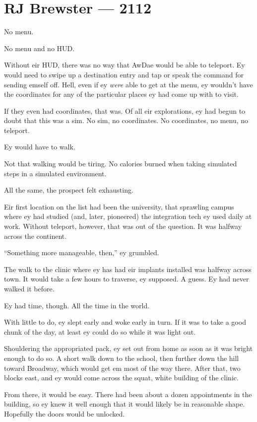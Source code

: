 \hypertarget{rj-brewster-2112}{%
\chapter*{RJ Brewster — 2112}\label{rj-brewster-2112}}

No menu.

No menu and no HUD.

Without eir HUD, there was no way that AwDae would be able to teleport. Ey would need to swipe up a destination entry and tap or speak the command for sending emself off. Hell, even if ey \emph{were} able to get at the menu, ey wouldn't have the coordinates for any of the particular places ey had come up with to visit.

If they even had coordinates, that was. Of all eir explorations, ey had begun to doubt that this was a sim. No sim, no coordinates. No coordinates, no menu, no teleport.

Ey would have to walk.

Not that walking would be tiring. No calories burned when taking simulated steps in a simulated environment.

All the same, the prospect felt exhausting.

Eir first location on the list had been the university, that sprawling campus where ey had studied (and, later, pioneered) the integration tech ey used daily at work. Without teleport, however, that was out of the question. It was halfway across the continent.

``Something more manageable, then,'' ey grumbled.

The walk to the clinic where ey has had eir implants installed was halfway across town. It would take a few hours to traverse, ey supposed. A guess. Ey had never walked it before.

Ey had time, though. All the time in the world.

With little to do, ey slept early and woke early in turn. If it was to take a good chunk of the day, at least ey could do so while it was light out.

Shouldering the appropriated pack, ey set out from home as soon as it was bright enough to do so. A short walk down to the school, then further down the hill toward Broadway, which would get em most of the way there. After that, two blocks east, and ey would come across the squat, white building of the clinic.

From there, it would be easy. There had been about a dozen appointments in the building, so ey knew it well enough that it would likely be in reasonable shape. Hopefully the doors would be unlocked.

